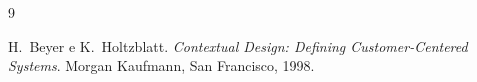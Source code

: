 \begin{thebibliography}{9}

H.~Beyer e K.~Holtzblatt.
\newblock \textit{Contextual Design: Defining Customer-Centered Systems}.
\newblock Morgan Kaufmann, San Francisco, 1998.

\end{thebibliography}
